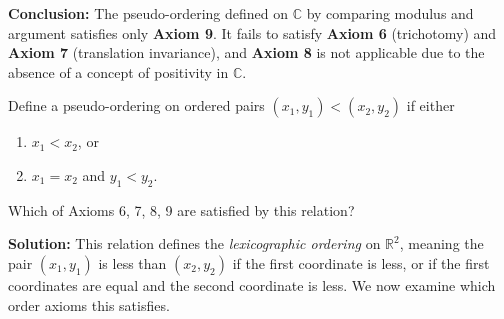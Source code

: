 \textbf{Conclusion:}  
The pseudo-ordering defined on \( \mathbb{C} \) by comparing modulus and argument satisfies only \textbf{Axiom 9}. It fails to satisfy \textbf{Axiom 6} (trichotomy) and \textbf{Axiom 7} (translation invariance), and \textbf{Axiom 8} is not applicable due to the absence of a concept of positivity in \( \mathbb{C} \).


\begin{problembox}
Define a pseudo-ordering on ordered pairs \((x_1, y_1) < (x_2, y_2)\) if either
\begin{enumerate}[label=(\roman*)]
\item \(x_1 < x_2\), or
\item \(x_1 = x_2\) and \(y_1 < y_2\).
\end{enumerate}
Which of Axioms 6, 7, 8, 9 are satisfied by this relation?
\end{problembox}

\textbf{Solution:}  
This relation defines the \emph{lexicographic ordering} on \(\mathbb{R}^2\), meaning the pair \((x_1, y_1)\) is less than \((x_2, y_2)\) if the first coordinate is less, or if the first coordinates are equal and the second coordinate is less. We now examine which order axioms this satisfies.

